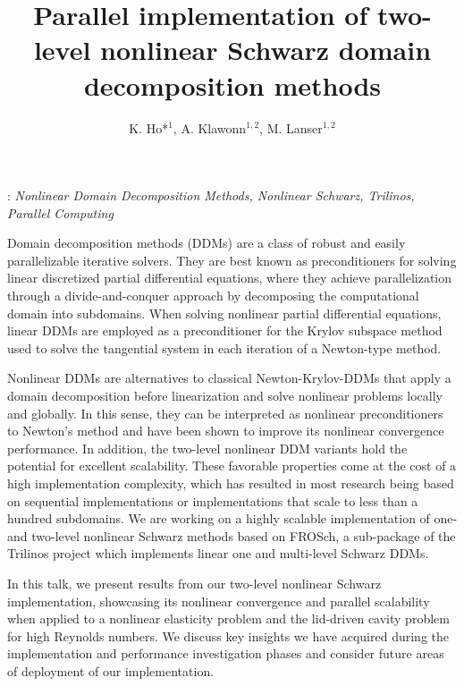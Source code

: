 \documentclass[12pt]{eccomas-2024}
\title{Parallel implementation of two-level nonlinear Schwarz domain decomposition methods\\}
\author{K. Ho*$^{1}$, A. Klawonn$^{1,2}$, M. Lanser$^{1,2}$}
\begin{document}
: {\it  Nonlinear Domain Decomposition Methods, Nonlinear Schwarz, Trilinos, Parallel Computing}
\vskip0.5cm

Domain decomposition methods (DDMs) are a class of robust and easily parallelizable iterative solvers. They are best known as preconditioners for solving linear discretized partial differential equations, where they achieve parallelization through a divide-and-conquer approach by decomposing the computational domain into subdomains. When solving nonlinear partial differential equations, linear DDMs are employed as a preconditioner for the Krylov subspace method used to solve the tangential system in each iteration of a Newton-type method.

Nonlinear DDMs are alternatives to classical Newton-Krylov-DDMs that apply a domain decomposition before linearization and solve nonlinear problems locally and globally. In this sense, they can be interpreted as nonlinear preconditioners to Newton's method and have been shown to improve its nonlinear convergence performance. In addition, the two-level nonlinear DDM variants hold the potential for excellent scalability. These favorable properties come at the cost of a high implementation complexity, which has resulted in most research being based on sequential implementations or implementations that scale to less than a hundred subdomains. We are working on a highly scalable implementation of one- and two-level nonlinear Schwarz methods based on FROSch, a sub-package of the Trilinos project which implements linear one and multi-level Schwarz DDMs.

In this talk, we present results from our two-level nonlinear Schwarz implementation, showcasing its nonlinear convergence and parallel scalability when applied to a nonlinear elasticity problem and the lid-driven cavity problem for high Reynolds numbers. We discuss key insights we have acquired during the implementation and performance investigation phases and consider future areas of deployment of our implementation.

\end{document}
